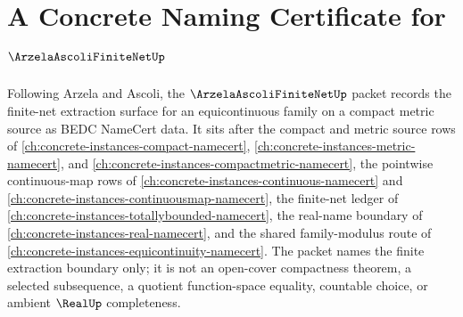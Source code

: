 \chapter{A Concrete Naming Certificate for $\ArzelaAscoliFiniteNetUp$}
\label{ch:concrete-instances-arzela-ascoli-finite-net-namecert}

Following Arzela and Ascoli, the $\ArzelaAscoliFiniteNetUp$ packet records the finite-net extraction surface for an equicontinuous family on a compact metric source as BEDC NameCert data. It sits after the compact and metric source rows of \autoref{ch:concrete-instances-compact-namecert}, \autoref{ch:concrete-instances-metric-namecert}, and \autoref{ch:concrete-instances-compactmetric-namecert}, the pointwise continuous-map rows of \autoref{ch:concrete-instances-continuous-namecert} and \autoref{ch:concrete-instances-continuousmap-namecert}, the finite-net ledger of \autoref{ch:concrete-instances-totallybounded-namecert}, the real-name boundary of \autoref{ch:concrete-instances-real-namecert}, and the shared family-modulus route of \autoref{ch:concrete-instances-equicontinuity-namecert}. The packet names the finite extraction boundary only; it is not an open-cover compactness theorem, a selected subsequence, a quotient function-space equality, countable choice, or ambient $\RealUp$ completeness.

